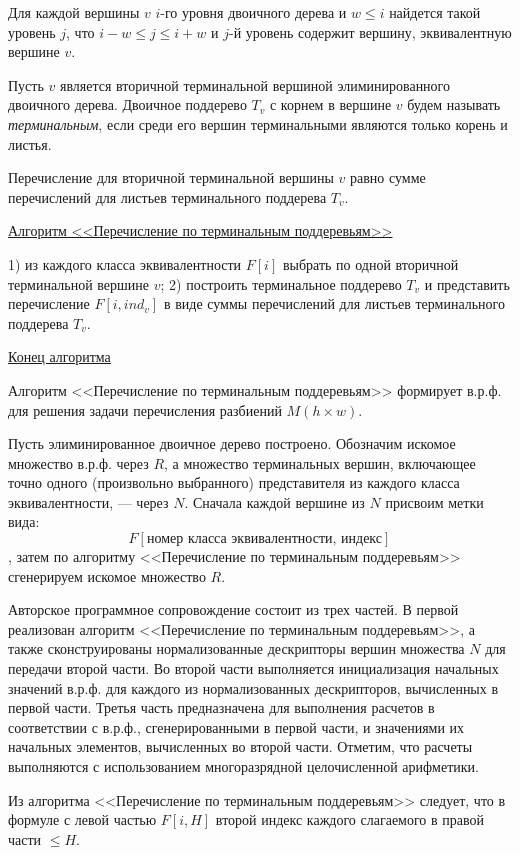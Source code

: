 \label{the3}
Для каждой вершины $v$  $i$-го уровня двоичного дерева и ${w\leq i}$ найдется такой уровень $j$, что  $i-w\leq j\leq i+w$ и $j$-й уровень содержит вершину, эквивалентную вершине $v$.


Пусть $v$ является вторичной терминальной вершиной элиминированного двоичного дерева. Двоичное поддерево $T_v$   с корнем в вершине $v$ будем называть \textit{ терминальным}, если среди его вершин терминальными являются только корень и листья.

\label{the4}
Перечисление для вторичной терминальной вершины $v$ равно сумме перечислений для листьев терминального поддерева $T_v$.

\underline{Алгоритм <<Перечисление по терминальным поддеревьям>>}

1) из каждого класса эквивалентности $F[i]$ выбрать по одной вторичной терминальной вершине $v$;
2) построить терминальное поддерево $T_v$  и представить перечисление $F[i,ind_v]$ в виде суммы перечислений для листьев терминального поддерева $T_v$.

\underline{Конец алгоритма}
\label{the5}

Алгоритм <<Перечисление по терминальным поддеревьям>> формирует в.р.ф. для решения задачи перечисления разбиений $M(h\times w)$.

Пусть элиминированное двоичное дерево построено. Обозначим искомое множество в.р.ф. через $R$, а множество терминальных вершин, включающее точно одного (произвольно выбранного) представителя из каждого класса эквивалентности, --- через $N$. Сначала каждой вершине из $N$ присвоим метки вида:
$$F[\text{номер класса эквивалентности, индекс}]$$,
затем по алгоритму <<Перечисление по терминальным поддеревьям>> сгенерируем искомое множество $R$.

Авторское программное сопровождение состоит из трех частей. В первой реализован алгоритм <<Перечисление по терминальным поддеревьям>>, а также сконструированы нормализованные дескрипторы вершин множества $N$ для передачи второй части. Во второй части выполняется инициализация начальных значений в.р.ф. для каждого из нормализованных дескрипторов, вычисленных в первой части. Третья часть предназначена для выполнения расчетов в соответствии с в.р.ф., сгенерированными в первой части, и значениями их начальных элементов, вычисленных во второй части. Отметим, что расчеты выполняются с использованием многоразрядной целочисленной арифметики.

Из алгоритма <<Перечисление по терминальным поддеревьям>> следует, что в формуле с левой частью $F[i,H]$ второй индекс каждого слагаемого в правой части  $\leq H$.

